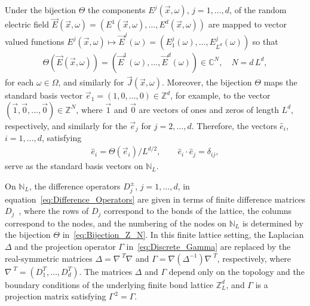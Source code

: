 \documentclass{cmslatex}
\begin{document}
Under the bijection $\Theta$ the components
$E^j(\vec{x},\omega)$, $j=1,\ldots,d$, of the random electric field
$\vec{E}(\vec{x},\omega)=(E^1(\vec{x},\omega),\ldots ,E^d(\vec{x},\omega))$ are mapped to
vector valued functions $E^j(\vec{x},\omega)\mapsto\vec{E}^j(\omega)=(E^j_1(\omega),\ldots,
E^j_{L^d}(\omega))$ so that
% 
\begin{align}\label{eq:bijection_vector_mapping}
  \Theta(\vec{E}(\vec{x},\omega))=(\vec{E}^1(\omega),\ldots ,\vec{E}^d(\omega))\in\mathbb{C}^N,
  \quad N=d\,L^d,
\end{align}
%
for each $\omega\in\Omega$, and similarly for $\vec{J}(\vec{x},\omega)$. Moreover, the
bijection $\Theta$ maps the standard basis vector
$\vec{e}_1=(1,0,\ldots,0)\in\mathbb{Z}^d$, for example, to the
vector $(\vec{1},\vec{0},\ldots,\vec{0})\in\mathbb{Z}^N$, where
$\vec{1}$ and $\vec{0}$ are vectors of ones and zeros of length
$L^d$, respectively, and similarly for the $\vec{e}_j$ for
$j=2,\ldots,d$. Therefore, the vectors $\hat{e}_i$, $i=1,\ldots,d$, satisfying
%
\begin{align}\label{eq:Lattice_Basis_e}
  \hat{e}_i=\Theta(\vec{e}_i)/L^{d/2},
  \qquad
  \hat{e}_i\cdot\hat{e}_j=\delta_{ij},
\end{align}
%
serve as the standard basis vectors on $\mathbb{N}_L$.


On $\mathbb{N}_L$, the difference operators $D_j^\pm$, $j=1,\ldots,d$, in
equation~\eqref{eq:Difference_Operators} are given in terms of finite 
difference matrices $D_j$~\cite{Demmel:1997}, where the rows of $D_j$
correspond to the bonds of the lattice, the columns
correspond to the nodes, and the numbering of the nodes on
$\mathbb{N}_L$ is determined by the bijection $\Theta$
in~\eqref{eq:Bijection_Z_N}. In this finite lattice  
setting, the Laplacian $\Delta$ and the projection operator $\Gamma$
in~\eqref{eq:Discrete_Gamma} are replaced by the real-symmetric
matrices $\Delta=\nabla^{\;T}\nabla$ and $\Gamma=\nabla(\Delta^{-1})\nabla^{\;T}$, respectively, where
$\nabla^{\;T}=(D_1^T,\ldots,D_d^T)$. The matrices $\Delta$ and $\Gamma$ depend only on the
topology and the boundary conditions of the underlying finite bond
lattice $\mathbb{Z}_L^d$, and $\Gamma$ is a projection matrix
satisfying $\Gamma^{\,2}=\Gamma$. 
\end{document}

